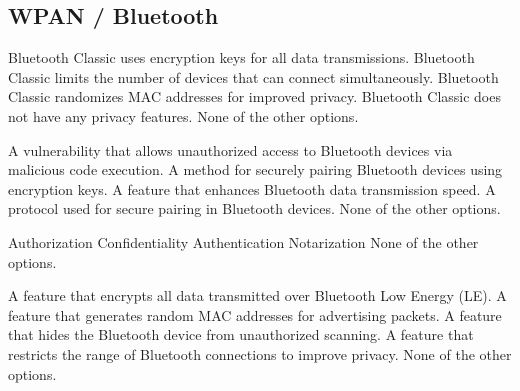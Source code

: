 \begin{questions}
    \section{WPAN / Bluetooth}

    \begin{checkboxes}
        \choice Bluetooth Classic uses encryption keys for all data transmissions.
        \choice Bluetooth Classic limits the number of devices that can connect simultaneously.
        \choice Bluetooth Classic randomizes MAC addresses for improved privacy.
        \choice Bluetooth Classic does not have any privacy features.
        \choice None of the other options.
    \end{checkboxes}

    \begin{checkboxes}
        \choice A vulnerability that allows unauthorized access to Bluetooth devices via malicious code execution.
        \choice A method for securely pairing Bluetooth devices using encryption keys.
        \choice A feature that enhances Bluetooth data transmission speed.
        \choice A protocol used for secure pairing in Bluetooth devices.
        \CorrectChoice None of the other options.
    \end{checkboxes}

    \begin{checkboxes}
        \CorrectChoice Authorization
        \CorrectChoice Confidentiality
        \CorrectChoice Authentication
        \choice Notarization
        \choice None of the other options.
    \end{checkboxes}




    \begin{checkboxes}
        \choice A feature that encrypts all data transmitted over Bluetooth Low Energy (LE).
        \CorrectChoice A feature that generates random MAC addresses for advertising packets.
        \choice A feature that hides the Bluetooth device from unauthorized scanning.
        \choice A feature that restricts the range of Bluetooth connections to improve privacy.
        \choice None of the other options.
    \end{checkboxes}



\end{questions}
